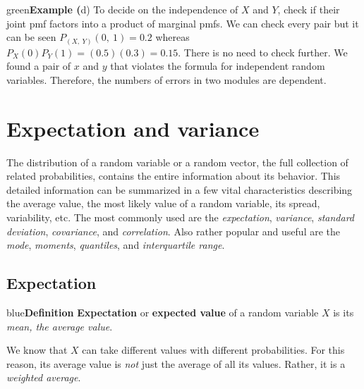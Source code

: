 \documentclass{article}
\newenvironment{example}[1]{\begin{mybox}{green}{\textbf{Example #1}}}{\end{mybox}}
\newenvironment{definition}[1]{\begin{mybox}{blue}{\textbf{Definition #1}}}{\end{mybox}}
\begin{document}
\begin{example}{2}
(d) To decide on the independence of $X$ and $Y$, check if their joint pmf factors into a product of marginal pmfs. We can check every pair but it can be seen $P_{(X,\ Y)}(0,\ 1) = 0.2$ whereas $P_X(0)P_Y(1) = (0.5)(0.3) = 0.15$. There is no need to check further. We found a pair of $x$ and $y$ that violates the formula for independent random variables. Therefore, the numbers of errors in two modules are dependent. 
\end{example}


\section{Expectation and variance}

The distribution of a random variable or a random vector, the full collection of related probabilities, contains the entire information about its behavior. This detailed information can be summarized in a few vital characteristics describing the average value, the most likely value of a random variable, its spread, variability, etc. The most commonly used are the \textit{expectation}, \textit{variance}, \textit{standard deviation}, \textit{covariance}, and \textit{correlation}. Also rather popular and useful are the \textit{mode}, \textit{moments}, \textit{quantiles}, and \textit{interquartile range}.

\subsection{Expectation}

\begin{definition}{}
\textbf{Expectation} or \textbf{expected value} of a random variable $X$ is its \textit{mean, the average value}.
\end{definition}

We know that $X$ can take different values with different probabilities. For this reason, its average value is \textit{not} just the average of all its values. Rather, it is a \textit{weighted average}.
\end{document}
